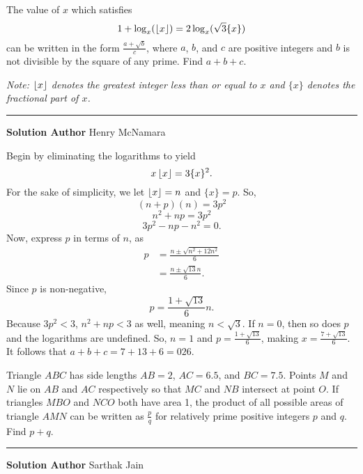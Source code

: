 \documentclass[11pt]{scrartcl}
\newcommand*{\problemfont}{\sffamily\bfseries}
\begin{document}
\begin{problem}
    The value of $x$ which satisfies
    \[1 + \log_{x}(\left\lfloor x \right\rfloor) = 2\log_{x}(\sqrt{3}\{x\})\]
    can be written in the form $\frac{a + \sqrt{b}}{c}$, where $a$, $b$, and $c$ are positive integers and $b$ is not divisible by the square of any prime. Find $a + b + c$.
    
    \emph{Note: $\left\lfloor x \right\rfloor$ denotes the greatest integer less than or equal to $x$ and $\{x\}$ denotes the fractional part of $x$.}    
\end{problem}

\vspace{-\baselineskip}\rule{\textwidth}{0.4pt}

{\problemfont Solution Author} Henry McNamara

Begin by eliminating the logarithms to yield
\[x\left\lfloor x \right\rfloor = 3\{x\}^{2}.\]
For the sake of simplicity, we let $\left\lfloor x \right\rfloor = n$ and $\{x\} = p$. So,
\[(n + p)(n) = 3p^{2}\]
\[n^{2} + np = 3p^{2}\]
\[3p^{2} - np - n^{2} = 0.\]
Now, express $p$ in terms of $n$, as
\begin{align*}
    p &= \frac{n \pm \sqrt{n^{2} + 12n^{2}}}{6} \\
    &= \frac{n \pm \sqrt{13}n}{6}.
\end{align*}
Since $p$ is non-negative,
\[p = \frac{1 + \sqrt{13}}{6}n.\]
Because $3p^{2} < 3$, $n^{2} + np < 3$ as well, meaning $n < \sqrt{3}$. If $n = 0$, then so does $p$ and the logarithms are undefined. So, $n = 1$ and $p = \frac{1 + \sqrt{13}}{6}$, making $x = \frac{7 + \sqrt{13}}{6}$. It follows that $a + b + c = 7 + 13 + 6 = \boxed{026}$.

\pagebreak

\begin{problem}
    Triangle $ABC$ has side lengths $AB = 2$, $AC = 6.5$, and $BC = 7.5$. Points $M$ and $N$ lie on $AB$ and $AC$ respectively so that $MC$ and $NB$ intersect at point $O$. If triangles $MBO$ and $NCO$ both have area 1, the product of all possible areas of triangle $AMN$ can be written as $\frac{p}{q}$ for relatively prime positive integers $p$ and $q$. Find $p + q$. 
\end{problem}

\vspace{-\baselineskip}\rule{\textwidth}{0.4pt}

{\problemfont Solution Author} Sarthak Jain
\end{document}
